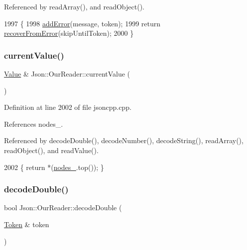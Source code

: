 Referenced by read\+Array(), and read\+Object().


\begin{DoxyCode}
1997                                                           \{
1998   \hyperlink{class_json_1_1_our_reader_aa6a920311e6408ff3a45324d49da18a6}{addError}(message, token);
1999   \textcolor{keywordflow}{return} \hyperlink{class_json_1_1_our_reader_a035651f0700a76a815e5f904c63ebb1c}{recoverFromError}(skipUntilToken);
2000 \}
\end{DoxyCode}
\mbox{\label{class_json_1_1_our_reader_a2acd5b1d53e7d7e17c21ff8e96edc09d}} 
\subsubsection{\texorpdfstring{current\+Value()}{currentValue()}}
{\footnotesize\ttfamily \hyperlink{class_json_1_1_value}{Value} \& Json\+::\+Our\+Reader\+::current\+Value (\begin{DoxyParamCaption}{ }\end{DoxyParamCaption})\hspace{0.3cm}{\ttfamily [private]}}



Definition at line 2002 of file jsoncpp.\+cpp.



References nodes\+\_\+.



Referenced by decode\+Double(), decode\+Number(), decode\+String(), read\+Array(), read\+Object(), and read\+Value().


\begin{DoxyCode}
2002 \{ \textcolor{keywordflow}{return} *(\hyperlink{class_json_1_1_our_reader_a19cc4e8c5d17ee6822f752e9a36f4ce3}{nodes\_}.top()); \}
\end{DoxyCode}
\mbox{\label{class_json_1_1_our_reader_a1d1c3b44f6720a0e7c39b5ae8de3981c}} 
\subsubsection{\texorpdfstring{decode\+Double()}{decodeDouble()}\hspace{0.1cm}{\footnotesize\ttfamily [1/2]}}
{\footnotesize\ttfamily bool Json\+::\+Our\+Reader\+::decode\+Double (\begin{DoxyParamCaption}\item[{\hyperlink{class_json_1_1_our_reader_1_1_token}{Token} \&}]{token }\end{DoxyParamCaption})\hspace{0.3cm}{\ttfamily [private]}}



